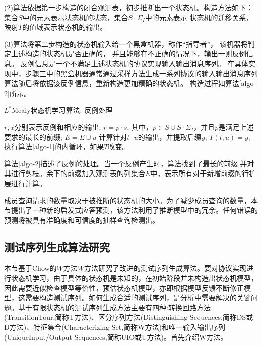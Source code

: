 	(2)算法依据第一步构造的闭合观测表，初步推断出一个状态机。构造方法如下：
	集合$S$中的元素表示状态机的状态，集合$S\cdot \Sigma_{I}$中的元素表示
	状态机的迁移关系，映射$T$的值域表示状态机的输出。

	(3)算法将第二步构造的状态机输入给一个黑盒机器，称作“指导者”，
	该机器将判定上述构造的状态机是否正确的，
	并且能够在不正确的情况下，输出一则反例信息。
	反例信息是一个不满足上述状态机的协议实现输入输出消息序列。
	在具体实现中，步骤三中的黑盒机器通常通过采样方法生成一系列协议的输入输出消息序列
	算法随后将依据该反例信息，重新构造更加精确的状态机。
	构造过程如算法\ref{algo-2}所示。


\begin{algorithm}
	\caption{$L^{*}$Mealy状态机学习算法: 反例处理}
	\label{algo-2}
	\begin{algorithmic}
		\STATE $r, x$分别表示反例和相应的输出;
		\STATE $r = p\cdot s$, 其中，$p \in S \cup S\cdot \Sigma_{I}$，并且$p$是满足上述要求的最长的前缀;
		\STATE $E = E \cup u $
		\STATE 计算针对$t\cdot u$的输出，并提取后缀$y$;
		\STATE $T(t,u) = y$;
		\ENDFOR
		\ENDFOR
		\STATE 执行算法\ref{algo-1}的内循环，如果$T$改变。
	\end{algorithmic}
\end{algorithm}

算法\ref{algo-2}描述了反例的处理。当一个反例产生时，算法找到了最长的前缀,并对其进行剪枝。余下的前缀加入观测表的列集合$E$中，表示所有对于新增前缀的行扩展进行计算。

成员查询请求的数量取决于被推断的状态机的大小。为了减少成员查询的数量，本节提出了一种新的启发式应答预测，该方法利用了推断模型中的冗余。任何错误的预测将被具有准确度和可信度的抽样查询检测出。

\subsection{测试序列生成算法研究}

本节基于Chow的$W$方法\cite{Chow1978}$W$方法研究了改进的测试序列生成算法。要对协议实现进行状态机学习，由于具体的状态机是未知的，在初始阶段并未构造出状态机模型，因此需要近似检查模型等价性，预估状态机模型，亦即根据模型反馈不断修正模型，这需要构造测试序列。如何生成合适的测试序列，是分析中需要解决的关键问题。基于有限状态机的测试序列生成方法主要有四种:转换回路方法(TransitionTour,简称T方法)、区分序列方法(Distinguishing Sequences,简称DS或D方法)、特征集合(Characterizing Set,简称W方法)和唯一输入输出序列(UniqueInput/Output Sequences,简称UIO或U方法)。首先介绍W方法。

